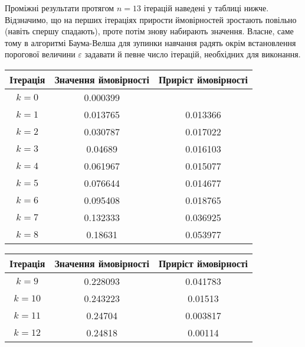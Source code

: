 \vspace{0.4cm}
Проміжні результати протягом $n=13$ ітерацій наведені у таблиці нижче. Відзначимо, що на перших ітераціях прирости ймовірностей зростають повільно (навіть спершу спадають), проте потім знову набирають значення. Власне, саме тому в алгоритмі Баума-Велша для зупинки навчання радять окрім встановлення порогової величини $\varepsilon$ задавати й певне число ітерацій, необхідних для виконання.

\vspace{0.4cm}
\begin{table}[H]
    \begin{center}
        \begin{tabular}{||c|S|S||}
            \hline
            Ітерація & Значення{ }ймовірності & Приріст{ }ймовірності \\
            \hline
            $k=0$ & 0.000399 & \\
            $k=1$ & 0.013765 & 0.013366 \\
            $k=2$ & 0.030787 & 0.017022 \\
            $k=3$ & 0.04689 & 0.016103 \\
            $k=4$ & 0.061967 & 0.015077 \\
            $k=5$ & 0.076644 & 0.014677 \\
            $k=6$ & 0.095408 & 0.018765 \\
            $k=7$ & 0.132333 & 0.036925 \\
            $k=8$ & 0.18631 & 0.053977 \\
            \hline
        \end{tabular}
    \end{center}
\end{table}

\begin{table}[H]
    \begin{center}
        \begin{tabular}{||c|S|S||}
            \hline
            Ітерація & Значення{ }ймовірності & Приріст{ }ймовірності \\
            \hline
            $k=9$ & 0.228093 & 0.041783 \\
            $k=10$ & 0.243223 & 0.01513 \\
            $k=11$ & 0.24704 & 0.003817 \\
            $k=12$ & 0.24818 & 0.00114 \\
            \hline
        \end{tabular}
    \end{center}
\end{table}

